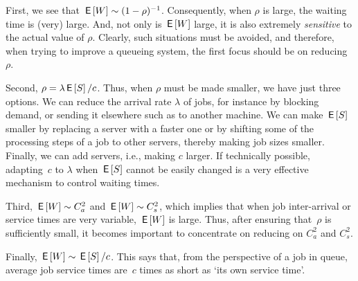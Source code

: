 \documentclass[stochastic-or.tex]{subfiles}
\begin{document}
First, we see that $\,\mathsf{E}\left[W\right] \sim (1-\rho)^{-1}$.
Consequently, when $\rho$ is large, the waiting time is (very) large. And,
not only is $\,\mathsf{E}\left[W\right]$ large, it is also extremely \emph{sensitive} to the actual value of $\rho$.
Clearly, such situations must be avoided, and therefore, when trying to improve a queueing system, the first focus should be on reducing~$\rho$.

Second, $\rho = \lambda \,\mathsf{E}\left[S\right]/c$.
Thus, when $\rho$ must be made smaller, we have just three options.
We can reduce the arrival rate $\lambda$ of jobs, for instance by blocking demand, or sending it elsewhere such as to another machine.
We can make $\,\mathsf{E}\left[S\right]$ smaller by replacing a server with a faster one or by shifting some of the processing steps of a job to other servers, thereby making job sizes smaller.
Finally, we can add servers, i.e., making $c$ larger.
If technically possible, adapting~$c$ to $\lambda$ when $\,\mathsf{E}\left[S\right]$ cannot be easily changed is a very effective mechanism to control waiting times.

Third, $\,\mathsf{E}\left[W\right] \sim C_a^2$ and $\,\mathsf{E}\left[W\right] \sim C_s^2$, which implies that when job inter-arrival or service times are very variable, $\,\mathsf{E}\left[W\right]$ is large.
Thus, after ensuring that~$\rho$ is sufficiently small, it becomes important to concentrate on reducing on $C_a^2$ and $C_s^2$.

Finally, $\,\mathsf{E}\left[W\right] \sim \,\mathsf{E}\left[S\right]/c$.
This says that, from the perspective of a job in queue, average job service times are~$c$ times as short as `its own service time'.



\end{document}
